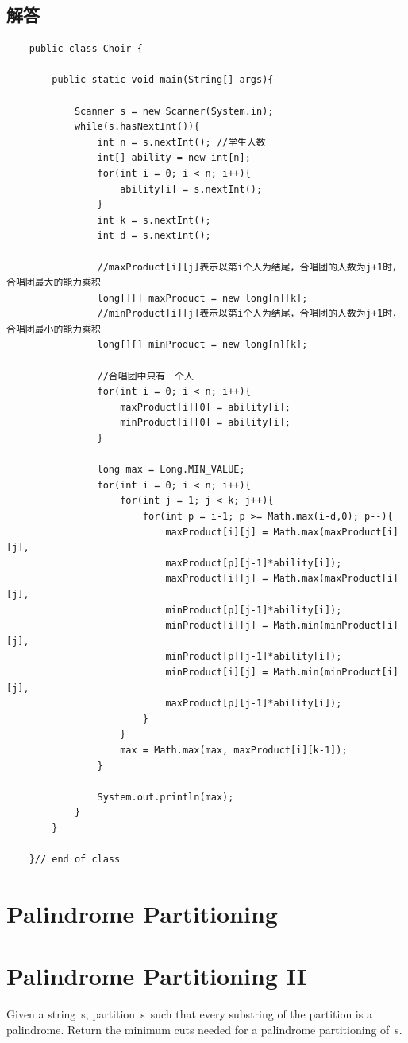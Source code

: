 \documentclass[UTF8,a4paper,12pt]{ctexbook}
\begin{document}
	\subsection{解答}
		\begin{lstlisting}
	public class Choir {  
		
		public static void main(String[] args){  
			
			Scanner s = new Scanner(System.in);  
			while(s.hasNextInt()){  
				int n = s.nextInt(); //学生人数  
				int[] ability = new int[n];  
				for(int i = 0; i < n; i++){  
					ability[i] = s.nextInt();  
				}  
				int k = s.nextInt();  
				int d = s.nextInt();  
				
				//maxProduct[i][j]表示以第i个人为结尾，合唱团的人数为j+1时，合唱团最大的能力乘积  
				long[][] maxProduct = new long[n][k];   
				//minProduct[i][j]表示以第i个人为结尾，合唱团的人数为j+1时，合唱团最小的能力乘积  
				long[][] minProduct = new long[n][k];  
				
				//合唱团中只有一个人  
				for(int i = 0; i < n; i++){  
					maxProduct[i][0] = ability[i];  
					minProduct[i][0] = ability[i];  
				}  
				
				long max = Long.MIN_VALUE;  
				for(int i = 0; i < n; i++){  
					for(int j = 1; j < k; j++){  
						for(int p = i-1; p >= Math.max(i-d,0); p--){  
							maxProduct[i][j] = Math.max(maxProduct[i][j],  
							maxProduct[p][j-1]*ability[i]);  
							maxProduct[i][j] = Math.max(maxProduct[i][j],  
							minProduct[p][j-1]*ability[i]);  
							minProduct[i][j] = Math.min(minProduct[i][j],  
							minProduct[p][j-1]*ability[i]);  
							minProduct[i][j] = Math.min(minProduct[i][j],  
							maxProduct[p][j-1]*ability[i]);  
						}  
					}  
					max = Math.max(max, maxProduct[i][k-1]);  
				}  

				System.out.println(max);  	
			}  
		}  
	
	}// end of class  
		\end{lstlisting}
		
\section{Palindrome Partitioning}
	
\section{Palindrome Partitioning II}
	Given a string s, partition s such that every substring of the partition is a palindrome.
	Return the minimum cuts needed for a palindrome partitioning of s.
	
\end{document}
